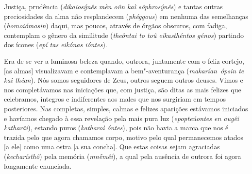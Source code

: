 \bekker{[250b]} Justiça, prudência (\emph{dikaiosýnês mèn oûn kaì
sôphrosýnês}) e tantas outras preciosidades da alma não resplandecem
(\emph{phéggous}) em nenhuma das semelhanças
(\emph{homoiómasin}) daqui, mas poucos, através de órgãos obscuros, com
fadiga, contemplam o gênero da similitude (\emph{theôntai to toû
eikasthéntos génos}) partindo dos ícones (\emph{epí tas eikónas
ióntes}).

Era de se ver a luminosa beleza quando, outrora, juntamente com o feliz
cortejo, [as almas] visualizavam e contemplavam a bem"-aventurança
(\emph{makarían}~\emph{ópsin te kaì théan}). Nós somos seguidores de
Zeus, outros seguem outros deuses. Vimos e nos completávamos nas
iniciações que, com justiça, são ditas as mais felizes que celebramos,
íntegros e indiferentes aos males que nos surgiriam em tempos
posteriores. Nas completas, simples, \bekker{[250c]} calmas e felizes
aparições estávamos iniciados e havíamos chegado à essa
revelação pela mais pura luz
(\emph{epopteúontes en augêi katharâi}), estando puros (\emph{katharoì
óntes}), pois não havia a marca que nos é trazida pelo que agora
chamamos corpo, motivo pelo qual permanecemos atados [a ele] como
uma ostra [a sua concha]. Que estas coisas sejam agraciadas
(\emph{kecharísthô}) pela memória (\emph{mnḗmêi}), a qual pela ausência de outrora foi
agora longamente enunciada.

